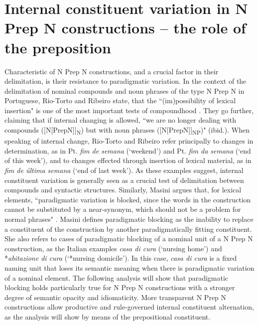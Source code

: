 \documentclass[output=paper]{langsci/langscibook}
\begin{document}
\section{Internal constituent variation in N Prep N constructions – the role of the preposition} 
Characteristic of N Prep N constructions, and a crucial factor in their delimitation, is their resistance to paradigmatic variation. In the context of the delimitation of nominal compounds and noun phrases of the type N Prep N in Portuguese, Rio-Torto and Ribeiro state, that the ``(im)possibility of lexical insertion" is one of the most important tests of compoundhood \citep[9]{RioTorto:2012}. They go further, claiming that if internal changing is allowed, ``we are no longer dealing with compounds ([N[PrepN]]\textsubscript{N})  but with noun phrases ([N[PrepN]]\textsubscript{NP})" (ibid.). When speaking of internal change, Rio-Torto and Ribeiro refer principally to changes in determination, as in Pt. \textit{fim de semana} (`weekend') and Pt. \textit{fim da semana} (`end of this week'), and to changes effected through insertion of lexical material, as in \textit{fim de última semana} (`end of last week'). As these examples suggest, internal constituent variation is generally seen as a crucial test of delimitation between compounds and syntactic structures. Similarly, Masini argues that, for lexical elements, ``paradigmatic variation is blocked, since the words in the construction cannot be substituted by a near-synonym, which should not be a problem for normal phrases" \citep[259]{Masini:2009}. Masini defines paradigmatic blocking as the inability to replace a constituent of the construction by another paradigmatically fitting constituent. She also refers to cases of paradigmatic blocking of a nominal unit of a N Prep N construction, as the Italian examples \textit{casa di cura} (`nursing home') and *\textit{abitazione di cura} (`*nursing domicile'). In this case, \textit{casa di cura} is a fixed naming unit that loses its semantic meaning when there is paradigmatic variation of a nominal element. The following analysis will show that paradigmatic blocking holds particularly true for N Prep N constructions with a stronger degree of semantic opacity and idiomaticity. More transparent N Prep N constructions allow productive and rule-governed internal constituent alternation, as the analysis will show by means of the prepositional constituent.
 
\end{document}
